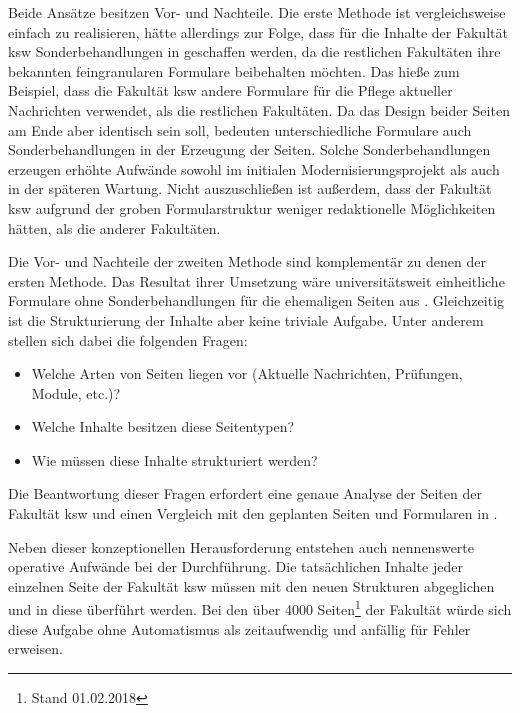             Beide Ansätze besitzen Vor- und Nachteile.
            Die erste Methode ist vergleichsweise einfach zu realisieren,
            hätte allerdings zur Folge, dass für die Inhalte der Fakultät \gls{ksw} Sonderbehandlungen
            in {\imperia} geschaffen werden, da die restlichen Fakultäten ihre bekannten feingranularen
            Formulare beibehalten möchten.
            Das hieße zum Beispiel, dass die Fakultät \gls{ksw} andere Formulare für die Pflege aktueller
            Nachrichten verwendet, als die restlichen Fakultäten.
            Da das Design beider Seiten am Ende aber identisch sein soll, bedeuten unterschiedliche Formulare
            auch Sonderbehandlungen in der Erzeugung der Seiten.
            Solche Sonderbehandlungen erzeugen erhöhte Aufwände sowohl im initialen Modernisierungsprojekt
            als auch in der späteren Wartung.
            Nicht auszuschließen ist außerdem, dass {\editors} der Fakultät \gls{ksw} aufgrund der groben Formularstruktur
            weniger redaktionelle Möglichkeiten hätten, als die anderer Fakultäten.

            Die Vor- und Nachteile der zweiten Methode sind komplementär zu denen der ersten Methode.
            Das Resultat ihrer Umsetzung wäre universitätsweit einheitliche Formulare
            ohne Sonderbehandlungen für die ehemaligen Seiten aus {\wordpress}.
            Gleichzeitig ist die Strukturierung der Inhalte aber keine triviale Aufgabe.
            Unter anderem stellen sich dabei die folgenden Fragen:

            \begin{itemize}
                \item Welche Arten von Seiten liegen vor (Aktuelle Nachrichten, Prüfungen, Module, etc.)?
                \item Welche Inhalte besitzen diese Seitentypen?
                \item Wie müssen diese Inhalte strukturiert werden?
            \end{itemize}

            Die Beantwortung dieser Fragen erfordert eine genaue Analyse der Seiten der Fakultät \gls{ksw}
            und einen Vergleich mit den geplanten Seiten und Formularen in {\imperia}.
            
            Neben dieser konzeptionellen Herausforderung entstehen auch nennenswerte operative Aufwände bei der Durchführung.
            Die tatsächlichen Inhalte jeder einzelnen Seite der Fakultät \gls{ksw}  müssen
            mit den neuen Strukturen abgeglichen und in diese überführt werden.
            Bei den über 4000 Seiten\footnote{Stand 01.02.2018} der Fakultät
            würde sich diese Aufgabe ohne Automatismus als zeitaufwendig und anfällig für Fehler erweisen.

